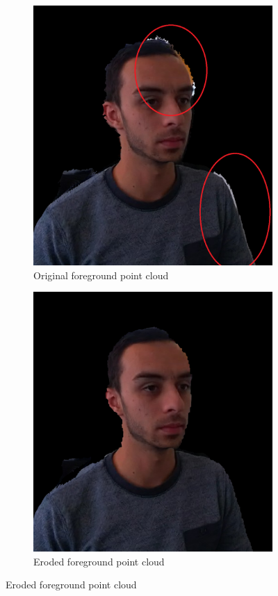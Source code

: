 \begin{figure}[!ht]

\begin{multicols}{2}
        \begin{subfigure}{\linewidth}
               \centering
                \includegraphics[width=.8\linewidth]{images/visual_enhancement/edge/face_white_noise_red.png}
               \caption{Original foreground point cloud}\label{figure:face_white_noise_red_2}
        \end{subfigure}
        
        
        \begin{subfigure}{\linewidth}
               \centering
             \includegraphics[width=.8\linewidth]{images/visual_enhancement/edge/eroded_face.png}
               \caption{Eroded foreground point cloud}\label{figure:eroded_face}
        \end{subfigure}
        

\end{multicols}
\end{figure}
